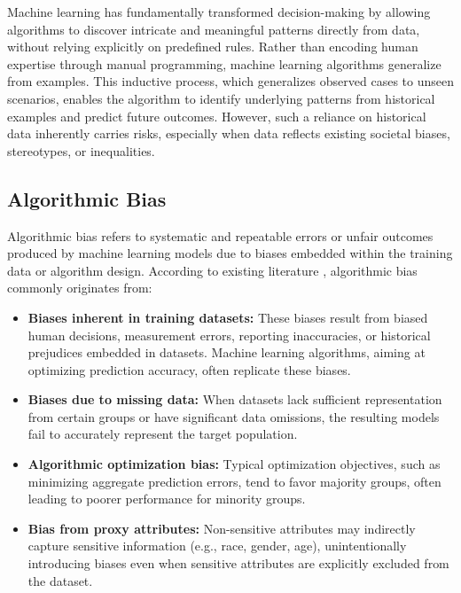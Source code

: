 Machine learning has fundamentally transformed decision-making by allowing algorithms to discover intricate and
meaningful patterns directly from data, without relying explicitly on predefined rules. Rather than encoding
human expertise through manual programming, machine learning algorithms generalize from examples. This inductive
process, which generalizes observed cases to unseen scenarios, enables the algorithm to identify underlying patterns
from historical examples and predict future outcomes. However, such a reliance on historical data inherently carries
    risks, especially when data reflects existing societal biases, stereotypes, or inequalities.

\subsection{Algorithmic Bias}\label{subsec:algorithmic_bias}

Algorithmic bias refers to systematic and repeatable errors or unfair outcomes produced by machine learning models
due to biases embedded within the training data or algorithm design. According to existing literature
\cite{barocas2016big,pessach2020algorithmic}, algorithmic bias commonly originates from:

\begin{itemize}
    \item \textbf{Biases inherent in training datasets:} These biases result from biased human decisions, measurement errors,
     reporting inaccuracies, or historical prejudices embedded in datasets. Machine learning algorithms, aiming at optimizing
     prediction accuracy, often replicate these biases.
    \item \textbf{Biases due to missing data:} When datasets lack sufficient representation from certain groups or have
     significant data omissions, the resulting models fail to accurately represent the target population.
    \item \textbf{Algorithmic optimization bias:} Typical optimization objectives, such as minimizing aggregate prediction
     errors, tend to favor majority groups, often leading to poorer performance for minority groups.
    \item \textbf{Bias from proxy attributes:} Non-sensitive attributes may indirectly capture sensitive information
     (e.g., race, gender, age), unintentionally introducing biases even when sensitive attributes are explicitly excluded
     from the dataset.
\end{itemize}

